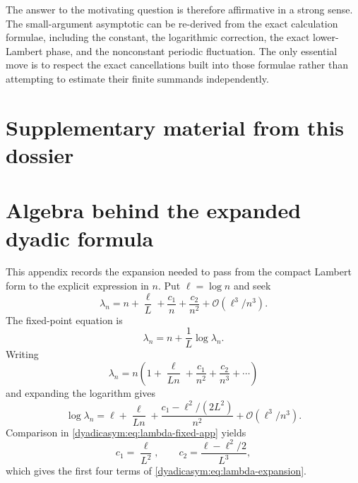 \documentclass[11pt,oneside]{article}
\theoremstyle{definition}
\theoremstyle{remark}
\newcommand{\bigO}{\mathcal O}
\begin{document}
The answer to the motivating question is therefore affirmative in a strong sense.  The
small-argument asymptotic can be re-derived from the exact calculation formulae, including the
constant, the logarithmic correction, the exact lower-Lambert phase, and the nonconstant
periodic fluctuation.  The only essential move is to respect the exact cancellations built
into those formulae rather than attempting to estimate their finite summands independently.

\clearpage
\section*{Supplementary material from this dossier}
\section{Algebra behind the expanded dyadic formula}
\label{dyadicasym:app:algebra}

This appendix records the expansion needed to pass from the compact Lambert form to the
explicit expression in $n$.  Put $\ell=\log n$ and seek
\begin{equation}
 \lambda_n=n+\frac\ell L+\frac{c_1}{n}+\frac{c_2}{n^2}
 +\bigO(\ell^3/n^3).                                       \label{dyadicasym:eq:lambda-ansatz}
\end{equation}
The fixed-point equation is
\begin{equation}
 \lambda_n=n+\frac1L\log\lambda_n.                         \label{dyadicasym:eq:lambda-fixed-app}
\end{equation}
Writing
\begin{equation*}
 \lambda_n=n\left(1+\frac\ell{Ln}+\frac{c_1}{n^2}
 +\frac{c_2}{n^3}+\cdots\right)
\end{equation*}
and expanding the logarithm gives
\begin{equation*}
 \log\lambda_n=
 \ell+\frac\ell{Ln}+\frac{c_1-\ell^2/(2L^2)}{n^2}
 +\bigO(\ell^3/n^3).
\end{equation*}
Comparison in \eqref{dyadicasym:eq:lambda-fixed-app} yields
\begin{equation}
 c_1=\frac\ell{L^2},
 \qquad
 c_2=\frac{\ell-\ell^2/2}{L^3},                            \label{dyadicasym:eq:c1-c2}
\end{equation}
which gives the first four terms of \eqref{dyadicasym:eq:lambda-expansion}.
\end{document}

